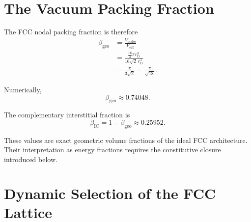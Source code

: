 \section{The Vacuum Packing Fraction}

The FCC nodal packing fraction is therefore
\begin{equation}
\begin{aligned}
    \beta_{\mathrm{geo}} &= \frac{V_{\mathrm{nodes}}}{V_{\mathrm{cell}}} \\[2pt]
    &= \frac{ \frac{16}{3}\pi r_{\mathrm{D}}^3 }{ 16\sqrt{2}\,r_{\mathrm{D}}^3 } \\[2pt]
    &= \frac{\pi}{3\sqrt{2}} = \frac{\pi}{\sqrt{18}}.
\end{aligned}
\end{equation}

Numerically,
\begin{equation}
    \beta_{\mathrm{geo}} \approx 0.74048.
\end{equation}

The complementary interstitial fraction is
\begin{equation}
    \beta_{\mathrm{IC}} = 1-\beta_{\mathrm{geo}} \approx 0.25952.
\end{equation}

These values are exact geometric volume fractions of the ideal FCC architecture. Their interpretation as energy fractions requires the constitutive closure introduced below.

\section{Dynamic Selection of the FCC Lattice}

